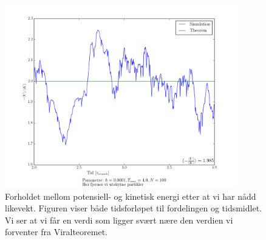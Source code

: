 \documentclass[11pt]{article}
\begin{document}
\begin{figure}[!ht]
  \centering
  \includegraphics[width=\textwidth,height=300px]{../fig/viral.png}
  \caption{\label{fig:viral} Forholdet mellom potensiell- og kinetisk
 energi etter at vi har nådd likevekt. Figuren viser både tidsforløpet
til fordelingen og tidsmidlet. Vi ser at vi får en verdi som ligger
svært nære den verdien vi forventer fra Viralteoremet.}
\end{figure}
\end{document}
